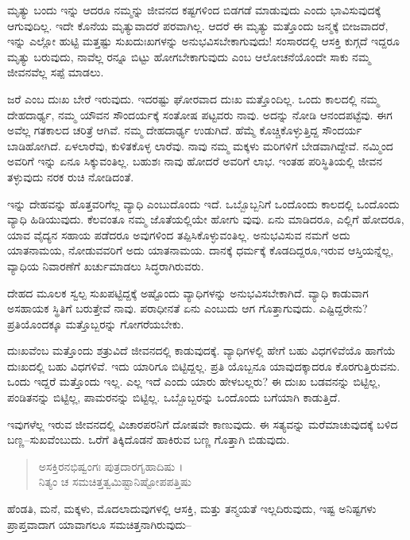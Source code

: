 ಮೃತ್ಯು ಬಂದು ಇನ್ನು ಆದರೂ ನಮ್ಮನ್ನು ಜೀವನದ ಕಷ್ಟಗಳಿಂದ ಬಿಡಗಡೆ ಮಾಡುವುದು ಎಂದು ಭಾವಿಸುವುದಕ್ಕೆ ಆಗುವುದಿಲ್ಲ. ಇದೇ ಕೊನೆಯ ಮೃತ್ಯುವಾದರೆ ಪರವಾಗಿಲ್ಲ. ಆದರೆ ಈ ಮೃತ್ಯು ಮತ್ತೊಂದು ಜನ್ಮಕ್ಕೆ ಬೀಜವಾದರೆ, ಇನ್ನು ಎಲ್ಲೋ ಹುಟ್ಟಿ ಮತ್ತಷ್ಟು ಸುಖದುಃಖಗಳನ್ನು ಅನುಭವಿಸಬೇಕಾಗುವುದು! ಸಂಸಾರದಲ್ಲಿ ಆಸಕ್ತಿ ಕುಗ್ಗದೆ ಇದ್ದರೂ ಮೃತ್ಯು ಬರುವುದು, ನಾವೆಲ್ಲ ರನ್ನೂ ಬಿಟ್ಟು ಹೋಗಬೇಕಾಗುವುದು ಎಂಬ ಆಲೋಚನೆಯೊಂದೇ ಸಾಕು ನಮ್ಮ ಜೀವನವೆಲ್ಲ ಸಪ್ಪೆ ಮಾಡಲು.

ಜರೆ ಎಂಬ ದುಃಖ ಬೇರೆ ಇರುವುದು. ಇದರಷ್ಟು ಘೋರವಾದ ದುಃಖ ಮತ್ತೊಂದಿಲ್ಲ. ಒಂದು ಕಾಲದಲ್ಲಿ ನಮ್ಮ ದೇಹದಾರ್ಢ್ಯ, ನಮ್ಮ ಯೌವನ ಸೌಂದರ್ಯಕ್ಕೆ ಸಂತೋಷ ಪಟ್ಟವರು ನಾವು. ಅದನ್ನು ನೋಡಿ ಆನಂದಪಟ್ಟೆವು. ಈಗ ಅವೆಲ್ಲ ಗತಕಾಲದ ಚರಿತ್ರೆ ಆಗಿವೆ. ನಮ್ಮ ದೇಹದಾರ್ಢ್ಯ ಉಡುಗಿದೆ. ಹೆಮ್ಮೆ ಕೊಚ್ಚಿಕೊಳ್ಳುತ್ತಿದ್ದ ಸೌಂದರ್ಯ ಬಾಡಿಹೋಗಿದೆ. ಏಳಲಾರೆವು, ಕುಳಿತಕೊಳ್ಳ ಲಾರೆವು. ನಾವು ನಮ್ಮ ಮಕ್ಕಳು ಮರಿಗಳಿಗೆ ಬೇಡವಾಗಿದ್ದೇವೆ. ನಮ್ಮಿಂದ ಅವರಿಗೆ ಇನ್ನು ಏನೂ ಸಿಕ್ಕುವಂತಿಲ್ಲ. ಬಹುಶಃ ನಾವು ಹೋದರೆ ಅವರಿಗೆ ಲಾಭ. ಇಂತಹ ಪರಿಸ್ಥಿತಿಯಲ್ಲಿ ಜೀವನ ತಳ್ಳುವುದು ನರಕ ರುಚಿ ನೋಡಿದಂತೆ.

ಇನ್ನು ದೇಹವನ್ನು ಹೊತ್ತವರಿಗೆಲ್ಲ ವ್ಯಾಧಿ ಎಂಬುದೊಂದು ಇದೆ. ಒಬ್ಬೊಬ್ಬನಿಗೆ ಒಂದೊಂದು ಕಾಲದಲ್ಲಿ ಒಂದೊಂದು ವ್ಯಾಧಿ ಹಿಡಿಯುವುದು. ಕೆಲವಂತೂ ನಮ್ಮ ಜೊತೆಯಲ್ಲಿಯೇ ಹೋಗು ವುವು. ಏನು ಮಾಡಿದರೂ, ಎಲ್ಲಿಗೆ ಹೋದರೂ, ಯಾವ ವೈದ್ಯನ ಸಹಾಯ ಪಡೆದರೂ ಅವುಗಳಿಂದ ತಪ್ಪಿಸಿಕೊಳ್ಳುವಂತಿಲ್ಲ. ಅನುಭವಿಸುವ ನಮಗೆ ಅದು ಯಾತನಾಮಯ, ನೋಡುವವರಿಗೆ ಅದು ಯಾತನಾಮಯ. ದಾನಕ್ಕೆ ಧರ್ಮಕ್ಕೆ ಕೊಡದಿದ್ದರೂ,ಇರುವ ಆಸ್ತಿಯನ್ನೆಲ್ಲ, ವ್ಯಾಧಿಯ ನಿವಾರಣೆಗೆ ಖರ್ಚುಮಾಡಲು ಸಿದ್ಧರಾಗಿರುವರು.

ದೇಹದ ಮೂಲಕ ಸ್ವಲ್ಪ ಸುಖಪಟ್ಟಿದ್ದಕ್ಕೆ ಅಷ್ಟೊಂದು ವ್ಯಾಧಿಗಳನ್ನು ಅನುಭವಿಸಬೇಕಾಗಿದೆ. ವ್ಯಾಧಿ ಕಾಡುವಾಗ ಅಸಹಾಯಕ ಸ್ಥಿತಿಗೆ ಬರುತ್ತೇವೆ ನಾವು. ಪರಾಧೀನತೆ ಏನು ಎಂಬುದು ಆಗ ಗೊತ್ತಾಗುವುದು. ಎಷ್ಟಿದ್ದರೇನು? ಪ್ರತಿಯೊಂದಕ್ಕೂ ಮತ್ತೊಬ್ಬರನ್ನು ಗೋಗರೆಯಬೇಕು.

ದುಃಖವೆಂಬ ಮತ್ತೊಂದು ಶತ್ರುವಿದೆ ಜೀವನದಲ್ಲಿ ಕಾಡುವುದಕ್ಕೆ. ವ್ಯಾಧಿಗಳಲ್ಲಿ ಹೇಗೆ ಬಹು ವಿಧಗಳಿವೆಯೊ ಹಾಗೆಯೆ ದುಃಖದಲ್ಲಿ ಬಹು ವಿಧಗಳಿವೆ. ಇದು ಯಾರಿಗೂ ಬಿಟ್ಟಿದ್ದಲ್ಲ. ಪ್ರತಿ ಯೊಬ್ಬನೂ ಯಾವುದಕ್ಕಾದರೂ ಕೊರಗುತ್ತಿರುವನು. ಒಂದು ಇದ್ದರೆ ಮತ್ತೊಂದು ಇಲ್ಲ. ಎಲ್ಲ ಇದೆ ಎಂದು ಯಾರು ಹೇಳಬಲ್ಲರು? ಈ ದುಃಖ ಬಡವನನ್ನು ಬಿಟ್ಟಿಲ್ಲ, ಪಂಡಿತನನ್ನು ಬಿಟ್ಟಿಲ್ಲ, ಪಾಮರನನ್ನು ಬಿಟ್ಟಿಲ್ಲ. ಒಬ್ಬೊಬ್ಬರನ್ನು ಒಂದೊಂದು ಬಗೆಯಾಗಿ ಕಾಡುತ್ತಿದೆ.

ಇವುಗಳೆಲ್ಲ ಇರುವ ಜೀವನದಲ್ಲಿ ವಿಚಾರಪರನಿಗೆ ದೋಷವೇ ಕಾಣುವುದು. ಈ ಸತ್ಯವನ್ನು ಮರೆಮಾಚುವುದಕ್ಕೆ ಬಳಿದ ಬಣ್ಣ–ಸುಖವೆಂಬುದು. ಒರೆಗೆ ತಿಕ್ಕಿದೊಡನೆ ಹಾಕಿರುವ ಬಣ್ಣ ಗೊತ್ತಾಗಿ ಬಿಡುವುದು.

\begin{verse}
ಅಸಕ್ತಿರನಭಿಷ್ವಂಗಃ ಪುತ್ರದಾರಗೃಹಾದಿಷು ।\\ನಿತ್ಯಂ ಚ ಸಮಚಿತ್ತತ್ವಮಿಷ್ಟಾನಿಷ್ಟೋಪಪತ್ತಿಷು 
\end{verse}

{\small ಹೆಂಡತಿ, ಮನೆ, ಮಕ್ಕಳು, ಮೊದಲಾದುವುಗಳಲ್ಲಿ ಆಸಕ್ತಿ, ಮತ್ತು ತನ್ಮಯತೆ ಇಲ್ಲದಿರುವುದು, ಇಷ್ಟ ಅನಿಷ್ಟಗಳು ಪ್ರಾಪ್ತವಾದಾಗ ಯಾವಾಗಲೂ ಸಮಚಿತ್ತನಾಗಿರುವುದು–}

